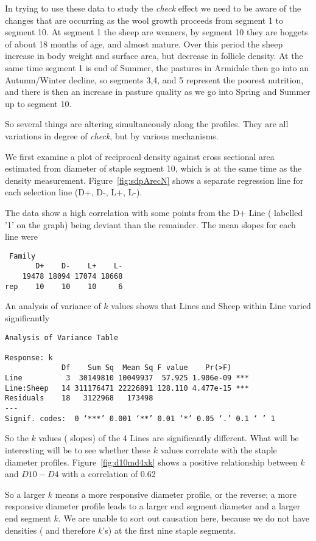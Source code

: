 \documentclass[titlepage]{article}  %
\begin{document}
In trying to use these data to study the {\em check} effect we need to be aware of the changes that are occurring as the wool growth proceeds from segment 1 to segment 10. At segment 1 the sheep are weaners, by segment 10 they are hoggets of about 18 months of age, and almost mature. Over this period the sheep increase in body weight and surface area, but decrease in follicle density. At the same time segment 1 is end of Summer, the pastures in Armidale then go into an Autumn/Winter decline, so segments 3,4, and 5 represent the poorest nutrition, and there is then an increase in pasture quality as we go into Spring and Summer up to segment 10.

So several things are altering simultaneously along the profiles.  They are all variations in degree of {\em check}, but by various mechanisms.

We first examine  a plot of reciprocal density against cross sectional area estimated from diameter of staple segment 10, which is at the same time as the density measurement. Figure~\ref{fig:sdpArecN} shows a separate regression line for each selection line (D+, D-, L+, L-).

The data show a high correlation with some points from the D+ Line ( labelled '1' on the graph) being deviant than the remainder. The mean slopes for each line were
\begin{verbatim}
 Family 
       D+    D-    L+    L-
    19478 18094 17074 18668
rep    10    10    10     6
\end{verbatim}
An analysis of variance of $k$ values shows that Lines  and Sheep within Line varied significantly
\begin{verbatim}
Analysis of Variance Table

Response: k
             Df    Sum Sq  Mean Sq F value    Pr(>F)    
Line          3  30149810 10049937  57.925 1.906e-09 ***
Line:Sheep   14 311176471 22226891 128.110 4.477e-15 ***
Residuals    18   3122968   173498                      
---
Signif. codes:  0 ‘***’ 0.001 ‘**’ 0.01 ‘*’ 0.05 ‘.’ 0.1 ‘ ’ 1
\end{verbatim}
So the $k$ values ( slopes) of the 4 Lines are significantly different. What will be interesting will be to see whether these $k$ values correlate with the staple diameter profiles. Figure~\ref{fig:d10md4xk} shows a positive relationship between $k$ and $D10-D4$ with a correlation of 0.62

So a larger $k$ means a more responsive diameter profile, or the reverse; a more responsive diameter profile leads to a larger end segment diameter and a larger end segment $k$. We are unable to sort out causation here, because we do not have densities ( and therefore $k$'s) at the first nine staple segments.
\end{document}
